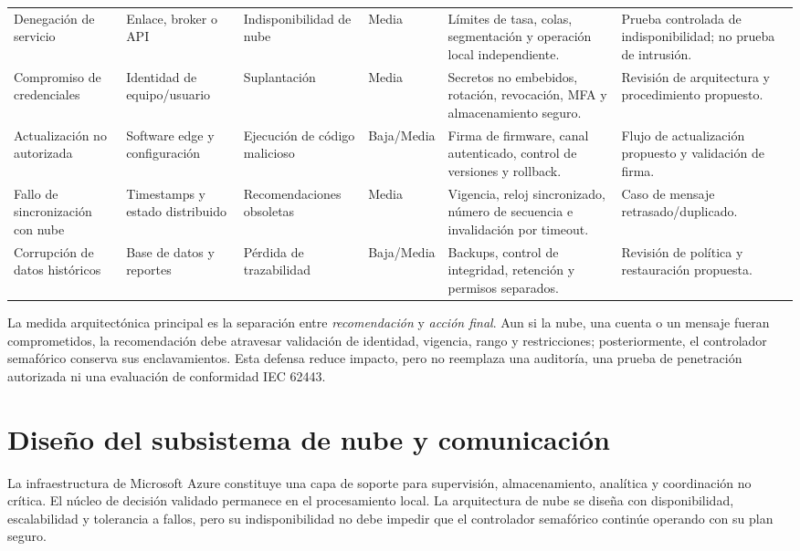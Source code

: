 \documentclass[12pt,a4paper,oneside]{report}
\begin{document}
\begin{landscape}
\begin{longtable}{@{}p{4.0cm}p{3.4cm}p{3.2cm}p{2.2cm}p{6.0cm}p{4.0cm}@{}}
Denegación de servicio & Enlace, broker o API & Indisponibilidad de nube & Media & Límites de tasa, colas, segmentación y operación local independiente. & Prueba controlada de indisponibilidad; no prueba de intrusión.\\
Compromiso de credenciales & Identidad de equipo/usuario & Suplantación & Media & Secretos no embebidos, rotación, revocación, MFA y almacenamiento seguro. & Revisión de arquitectura y procedimiento propuesto.\\
Actualización no autorizada & Software edge y configuración & Ejecución de código malicioso & Baja/Media & Firma de firmware, canal autenticado, control de versiones y rollback. & Flujo de actualización propuesto y validación de firma.\\
Fallo de sincronización con nube & Timestamps y estado distribuido & Recomendaciones obsoletas & Media & Vigencia, reloj sincronizado, número de secuencia e invalidación por timeout. & Caso de mensaje retrasado/duplicado.\\
Corrupción de datos históricos & Base de datos y reportes & Pérdida de trazabilidad & Baja/Media & Backups, control de integridad, retención y permisos separados. & Revisión de política y restauración propuesta.\\
\bottomrule
\end{longtable}
\end{landscape}

La medida arquitectónica principal es la separación entre \emph{recomendación} y \emph{acción final}. Aun si la nube, una cuenta o un mensaje fueran comprometidos, la recomendación debe atravesar validación de identidad, vigencia, rango y restricciones; posteriormente, el controlador semafórico conserva sus enclavamientos. Esta defensa reduce impacto, pero no reemplaza una auditoría, una prueba de penetración autorizada ni una evaluación de conformidad IEC 62443.

\section{Diseño del subsistema de nube y comunicación}\label{diseuxf1o-del-subsistema-de-nube-y-comunicaciuxf3n}

La infraestructura de Microsoft Azure constituye una capa de soporte para supervisión, almacenamiento, analítica y coordinación no crítica. El núcleo de decisión validado permanece en el procesamiento local. La arquitectura de nube se diseña con disponibilidad, escalabilidad y tolerancia a fallos, pero su indisponibilidad no debe impedir que el controlador semafórico continúe operando con su plan seguro.
\end{document}
